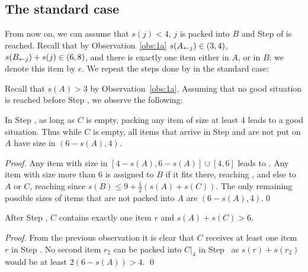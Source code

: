 \subsection{The standard case}
From now on, we can assume that $s(j) < 4$, $j$ is packed into $B$ and
Step  of \tbalg is reached. Recall that by Observation~\ref{obs:1a}
$s(A_{\leftarrow j}) \in  (3,4)$, $s(B_{\leftarrow j}) + s(j) \in(6,8)$, and
there is exactly one item either in $A$, or in $B$; we denote this item by $e$.
We repeat the steps done by \tbalg in the standard case:

\smallskip
{}

Recall that $s(A) > 3$ by Observation~\ref{obs:1a}. Assuming
that no good situation is reached before Step , we
observe the following:


\begin{obs}
\label{obs:6-b}
In Step {\rm {}}, as long as $C$ is empty,
packing any item of size at least $4$ leads to a good
situation. Thus while $C$ is empty, all items that 
arrive in Step {\rm {}} and are not put on $A$ 
have size in $(6-s(A),4)$.
\end{obs}
\begin{proof}
Any item with size in $[4-s(A),6-s(A)]\cup[4,6]$ leads to . 
Any item with size more than 6 is assigned to $B$ if it fits there,
reaching , and else to $A$ or $C$, reaching  since $s(B)\le9+\frac{1}{2}(s(A)+s(C))$. The only remaining
possible sizes of items that are not packed into $A$ are $(6-s(A),4)$.\qed
\end{proof}

\begin{cor}
\label{obs:c}
After Step {\rm {}}, $C$ contains exactly one item $r$ and $s(A)+s(C)>6$.
\end{cor}

\begin{proof}
From the previous observation it is clear that $C$ receives at least one item $r$ in Step . No second
item $r_2$ can be packed into $C|_4$ in Step~ as $s(r) + s(r_2)$ would be at least $2(6 - s(A)) > 4$. \qed
\end{proof}


